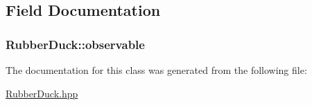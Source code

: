 \subsection{Field Documentation}
\hypertarget{classRubberDuck_aa15c9a6c44288dfcef988bd28d97b35d}{
\subsubsection[{observable}]{ Rubber\-Duck\-::observable\hspace{0.3cm}{\ttfamily [private]}}}\label{classRubberDuck_aa15c9a6c44288dfcef988bd28d97b35d}


The documentation for this class was generated from the following file\-:\begin{DoxyCompactItemize}
\item 
\hyperlink{RubberDuck_8hpp}{Rubber\-Duck.\-hpp}\end{DoxyCompactItemize}
